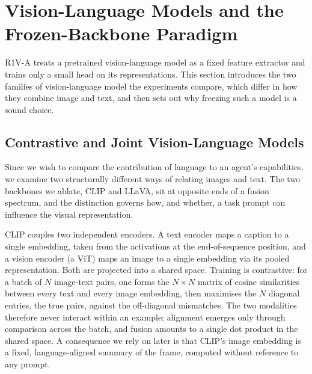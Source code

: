 \section{Vision-Language Models and the Frozen-Backbone Paradigm}
\label{sec:bg-vlm}
R1V-A treats a pretrained vision-language model as a fixed feature extractor
and trains only a small head on its representations. This section introduces
the two families of vision-language model the experiments compare, which
differ in how they combine image and text, and then sets out why freezing
such a model is a sound choice.

\subsection{Contrastive and Joint Vision-Language Models}
\label{subsec:bg-vlm-families}
Since we wish to compare the contribution of language to an agent's
capabilities, we examine two structurally different ways of relating images
and text. The two backbones we ablate, CLIP and LLaVA, sit at opposite ends
of a fusion spectrum, and the distinction governs how, and whether, a task
prompt can influence the visual representation.

CLIP \cite{radford2021clip} couples two independent encoders. A text encoder
maps a caption to a single embedding, taken from the activations at the
end-of-sequence position, and a vision encoder (a ViT) maps an image to a
single embedding via its pooled representation. Both are projected into a
shared space. Training is contrastive: for a batch of $N$ image-text pairs,
one forms the $N \times N$ matrix of cosine similarities between every text
and every image embedding, then maximises the $N$ diagonal entries, the true
pairs, against the off-diagonal mismatches. The two modalities therefore
never interact within an example; alignment emerges only through comparison
across the batch, and fusion amounts to a single dot product in the shared
space. A consequence we rely on later is that CLIP's image embedding is a
fixed, language-aligned summary of the frame, computed without reference to
any prompt.

